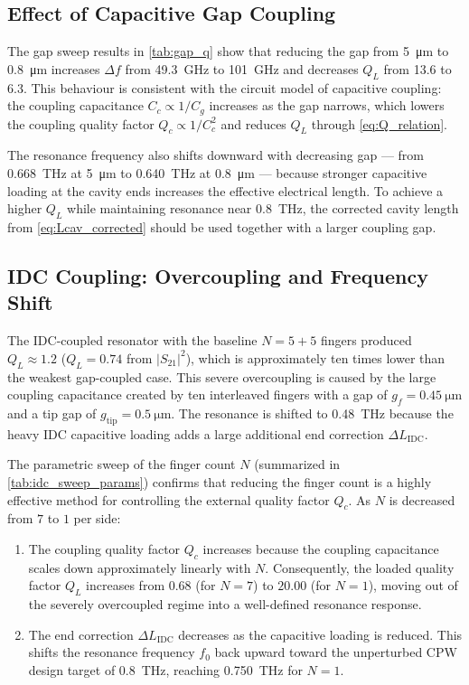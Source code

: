 \documentclass[12pt,a4paper]{article}
\begin{document}
\subsection{Effect of Capacitive Gap Coupling}

The gap sweep results in \cref{tab:gap_q} show that reducing the gap
from \SI{5}{\micro\metre} to \SI{0.8}{\micro\metre} increases $\Delta f$
from \SI{49.3}{\giga\hertz} to \SI{101}{\giga\hertz} and decreases $Q_L$
from 13.6 to 6.3. This behaviour is consistent with the circuit model of
capacitive coupling: the coupling capacitance $C_c \propto 1/C_g$ increases
as the gap narrows, which lowers the coupling quality factor
$Q_c \propto 1/C_c^2$ and reduces $Q_L$ through \cref{eq:Q_relation}.

The resonance frequency also shifts downward with decreasing gap --- from
\SI{0.668}{\tera\hertz} at \SI{5}{\micro\metre} to \SI{0.640}{\tera\hertz}
at \SI{0.8}{\micro\metre} --- because stronger capacitive loading at the
cavity ends increases the effective electrical length. To achieve a higher
$Q_L$ while maintaining resonance near \SI{0.8}{\tera\hertz}, the
corrected cavity length from \cref{eq:Lcav_corrected} should be used
together with a larger coupling gap.

\subsection{IDC Coupling: Overcoupling and Frequency Shift}

The IDC-coupled resonator with the baseline $N = 5+5$ fingers produced $Q_L \approx 1.2$ ($Q_L = 0.74$ from $|S_{21}|^2$), which is approximately ten times lower than the weakest gap-coupled case. This severe overcoupling is caused by the large coupling capacitance created by ten interleaved fingers with a gap of $g_f = \SI{0.45}{\micro\metre}$ and a tip gap of $g_{\mathrm{tip}} = \SI{0.5}{\micro\metre}$. The resonance is shifted to \SI{0.48}{\tera\hertz} because the heavy IDC capacitive loading adds a large additional end correction $\Delta L_{\mathrm{IDC}}$.

The parametric sweep of the finger count $N$ (summarized in \cref{tab:idc_sweep_params}) confirms that reducing the finger count is a highly effective method for controlling the external quality factor $Q_c$. As $N$ is decreased from $7$ to $1$ per side:
\begin{enumerate}
    \item The coupling quality factor $Q_c$ increases because the coupling capacitance scales down approximately linearly with $N$. Consequently, the loaded quality factor $Q_L$ increases from $0.68$ (for $N=7$) to $20.00$ (for $N=1$), moving out of the severely overcoupled regime into a well-defined resonance response.
    \item The end correction $\Delta L_{\mathrm{IDC}}$ decreases as the capacitive loading is reduced. This shifts the resonance frequency $f_0$ back upward toward the unperturbed CPW design target of \SI{0.8}{\tera\hertz}, reaching \SI{0.750}{\tera\hertz} for $N=1$.
\end{enumerate}
\end{document}
